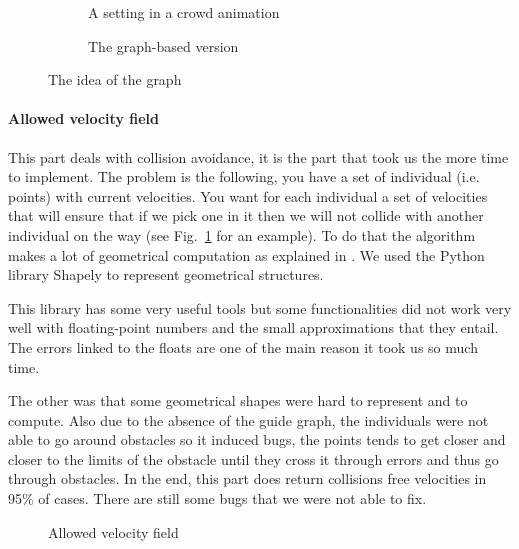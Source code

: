 \begin{figure}[h!]
  \centering
  \begin{subfigure}[t]{0.45\textwidth}
    \scalebox{.4}{}
    \caption{A setting in a crowd animation}
  \end{subfigure} %
  \begin{subfigure}[t]{0.45\textwidth}
    \scalebox{.4}{}
    \caption{The graph-based version}
  \end{subfigure}
  \caption{The idea of the graph}
\end{figure}


\paragraph{Allowed velocity field}

This part deals with collision avoidance, it is the part that
took us the more time to implement. The problem is the following, you
have a set of individual (i.e. points) with current velocities. You
want for each individual a set of velocities that will ensure that if
we pick one in it then we will not collide with another individual on
the way (see Fig.~\ref{fig:avf} for an example). To do that the algorithm
makes a lot of geometrical computation as explained in
\cite{vandenBerg2011}. We used the Python library Shapely to represent
geometrical structures.

This library has some very useful tools but some functionalities did
not work very well with floating-point numbers and the small
approximations that they entail. The errors linked to the floats are
one of the main reason it took us so much time. 


The other was that some geometrical shapes were hard to represent and
to compute.  Also due to the absence of the guide graph, the
individuals were not able to go around obstacles so it induced bugs,
the points tends to get closer and closer to the limits of the
obstacle until they cross it through errors and thus go through
obstacles.  In the end, this part does return collisions free
velocities in 95\% of cases. There are still some bugs that we were
not able to fix.  %


\begin{figure}[h!]
  \centering
  \scalebox{.475}{}
  \caption{Allowed velocity field}
  \label{fig:avf}
\end{figure}



